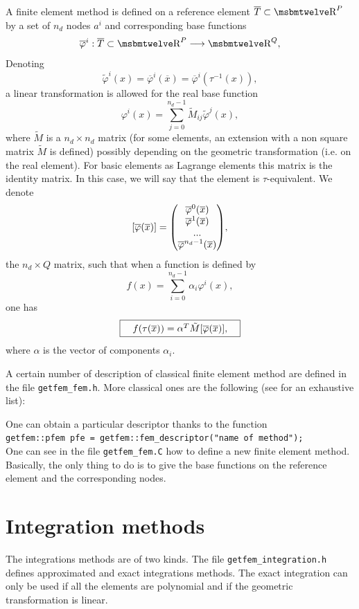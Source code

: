 \documentclass[11pt,a4paper]{article}
\begin{document}
A finite element method is defined on a reference element $\overline{T} \subset \Reel^P$ by a set of $n_d$ nodes $a^i$ and corresponding base functions 
$$ \overline{\varphi}^i : \overline{T} \subset \Reel^P \longrightarrow \Reel^Q, $$
Denoting
$$ \tilde{\varphi}^i(x) = \overline{\varphi}^i(\overline{x}) = \overline{\varphi}^i(\tau^{-1}(x)), $$
a linear transformation is allowed for the real base function
$$ \varphi^i(x) = \sum_{j = 0}^{n_d - 1} \tilde{M}_{ij} \tilde{\varphi}^j(x), $$
where $\tilde{M}$ is a $n_d \times n_d$ matrix (for some elements, an extension with a non square matrix $\tilde{M}$ is defined) possibly depending on the geometric transformation (i.e. on the real element). For basic elements as Lagrange elements this matrix is the identity matrix. In this case, we will say that the element is $\tau$-equivalent.
We denote
$$ [\overline{\varphi}(\overline{x})] = {\left(\hspace{-.5em}\begin{array}{c} {\overline{\varphi}^0(\overline{x})} \\ {\overline{\varphi}^1(\overline{x})} \\ {...} \\ {\overline{\varphi}^{n_d-1}(\overline{x})} \end{array}\hspace{-.5em}\right)}, $$
the $n_d \times Q$ matrix, such that when a function is defined by
$$ f(x) = \sum_{i = 0}^{n_d - 1} \alpha_i \varphi^i(x), $$
one has
$$ \fbox{$\hspace{1em} f(\tau(\overline{x})) = \alpha^T \tilde{M} [\overline{\varphi}(\overline{x})],\hspace{1em}$} $$
where $\alpha$ is the vector of components $\alpha_i$.

A certain number of description of classical finite element method are defined in the file {\tt getfem\_fem.h}. More classical ones are the following (see \cite{FEM_LIST} for an exhaustive list):


One can obtain a particular descriptor thanks to the function\\[0.5cm]
{\tt getfem::pfem pfe = getfem::fem\_descriptor("name of method"); }\\[0.5cm]
One can see in the file {\tt getfem\_fem.C} how to define a new finite element method. Basically, the only thing to do is to give the base functions on the reference element and the corresponding nodes.

\section{Integration methods}

The integrations methods are of two kinds. The file {\tt getfem\_integration.h} defines approximated and exact integrations methods. The exact integration can only be used if all the elements are polynomial and if the geometric transformation is linear.
\end{document}
